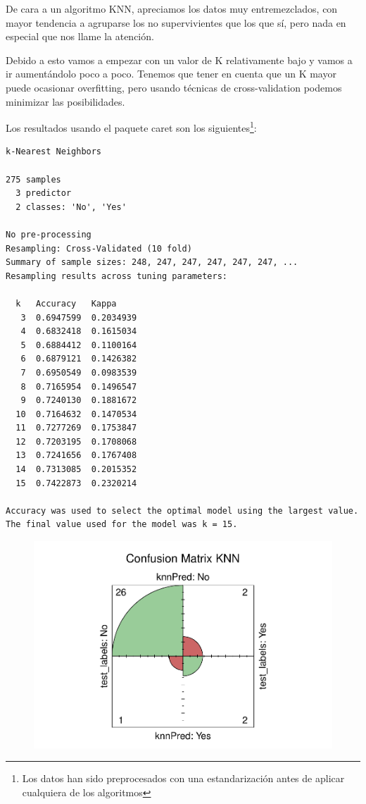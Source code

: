 De cara a un algoritmo KNN, apreciamos los datos muy entremezclados, con mayor tendencia a agruparse los no supervivientes que los que sí, pero nada en especial que nos llame la atención.

\vspace{\baselineskip}

Debido a esto vamos a empezar con un valor de K relativamente bajo y vamos a ir aumentándolo poco a poco. Tenemos que tener en cuenta que un K mayor puede ocasionar overfitting, pero usando técnicas de cross-validation podemos minimizar las posibilidades.

Los resultados usando el paquete caret son los siguientes\footnote{Los datos han sido preprocesados con una estandarización antes de aplicar cualquiera de los algoritmos}:
\begin{verbatim}
k-Nearest Neighbors 

275 samples
  3 predictor
  2 classes: 'No', 'Yes' 

No pre-processing
Resampling: Cross-Validated (10 fold) 
Summary of sample sizes: 248, 247, 247, 247, 247, 247, ... 
Resampling results across tuning parameters:

  k   Accuracy   Kappa    
   3  0.6947599  0.2034939
   4  0.6832418  0.1615034
   5  0.6884412  0.1100164
   6  0.6879121  0.1426382
   7  0.6950549  0.0983539
   8  0.7165954  0.1496547
   9  0.7240130  0.1881672
  10  0.7164632  0.1470534
  11  0.7277269  0.1753847
  12  0.7203195  0.1708068
  13  0.7241656  0.1767408
  14  0.7313085  0.2015352
  15  0.7422873  0.2320214

Accuracy was used to select the optimal model using the largest value.
The final value used for the model was k = 15.
\end{verbatim}

\begin{figure}[H]\center\includegraphics[width=.9\linewidth]{img/Clasificacion_files/figure-latex/unnamed-chunk-11-1}\caption{}\end{figure}

